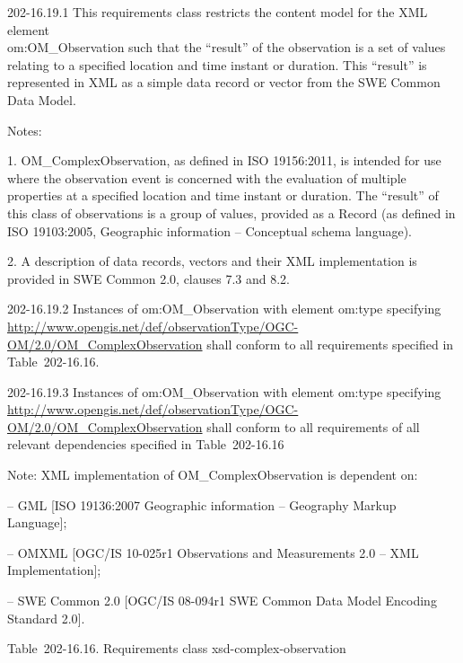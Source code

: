 202-16.19.1 This requirements class restricts the content model for the XML element\\
om:OM\_Observation such that the ``result'' of the observation is a set of values relating to a specified location and time instant or duration. This ``result'' is represented in XML as a simple data record or vector from the SWE Common Data Model.

Notes:

1. OM\_ComplexObservation, as defined in ISO 19156:2011, is intended for use where the observation event is concerned with the evaluation of multiple properties at a specified location and time instant or duration. The ``result'' of this class of observations is a group of values, provided as a Record (as defined in ISO 19103:2005, Geographic information -- Conceptual schema language).

2. A description of data records, vectors and their XML implementation is provided in SWE Common 2.0, clauses 7.3 and 8.2.

202-16.19.2 Instances of om:OM\_Observation with element om:type specifying \url{http://www.opengis.net/def/observationType/OGC-OM/2.0/OM_ComplexObservation} shall conform to all requirements specified in Table~202-16.16.

202-16.19.3 Instances of om:OM\_Observation with element om:type specifying \url{http://www.opengis.net/def/observationType/OGC-OM/2.0/OM_ComplexObservation} shall conform to all requirements of all relevant dependencies specified in Table~202-16.16

Note: XML implementation of OM\_ComplexObservation is dependent on:

-- GML {[}ISO 19136:2007 Geographic information -- Geography Markup Language{]};

-- OMXML {[}OGC/IS 10-025r1 Observations and Measurements 2.0 -- XML Implementation{]};

-- SWE Common 2.0 {[}OGC/IS 08-094r1 SWE Common Data Model Encoding Standard 2.0{]}.

Table~202-16.16. Requirements class xsd-complex-observation

